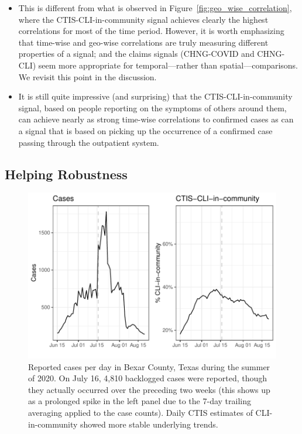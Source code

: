 \documentclass[9pt,twocolumn,twoside,lineno]{pnas-new}
\begin{document}
\begin{itemize}
\item This is different from what is observed in
  Figure~\ref{fig:geo_wise_correlation}, where the CTIS-CLI-in-community signal
  achieves clearly the highest correlations for most of the time period. 
  However, it is worth emphasizing that time-wise and geo-wise 
  correlations are truly measuring different properties of a signal; and the
  claims signals (CHNG-COVID and CHNG-CLI) seem more appropriate for
  temporal---rather than spatial---comparisons.  We revisit this point in the
  discussion.

\item It is still quite impressive (and surprising) that the
  CTIS-CLI-in-community signal, based on people reporting on the symptoms of
  others around them, can achieve  nearly as strong time-wise correlations to
  confirmed cases as can a signal that is based on picking up the occurrence of
  a confirmed case passing through the outpatient system.
\end{itemize}

\subsection{Helping Robustness}

\begin{figure}[t]
  \includegraphics[width=\columnwidth]{fig/bexar_compare.pdf}
  \caption{Reported cases per day in Bexar County, Texas during the summer of
    2020. On July 16, 4,810 backlogged cases were reported, though they actually
    occurred over the preceding two weeks (this shows up as a prolonged spike in
    the left panel due to the 7-day trailing averaging applied to the case
    counts). Daily CTIS estimates of CLI-in-community showed more stable 
    underlying trends.}
  \label{fig:bexar_compare}
\end{figure}
\end{document}
